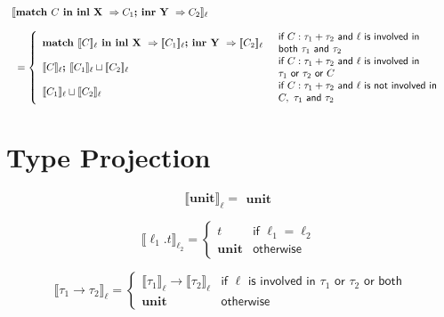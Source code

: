 \documentclass{article}
\begin{document}
$$\begin{array}{l}
 \llbracket  \textbf{match } C \textbf{ in inl X } \Rightarrow C_1 \textbf{; inr Y } \Rightarrow C_2 \rrbracket _\ell\\ \\ \;\;= \left\{
    \begin{array}{l l}
    \textbf{match }\llbracket C \rrbracket _\ell \textbf{ in inl X } \Rightarrow \llbracket C_1 \rrbracket _\ell \textbf{; inr Y } \Rightarrow \llbracket C_2 \rrbracket _\ell & 
    \begin{array}{l}
    \textsf{if } C : \tau_1 + \tau_2 \textsf{ and } \ell \textsf{ is involved in} \\ \textsf{both } \tau_1 \textsf{ and }\tau_2 
    \end{array}    \\
    \llbracket C \rrbracket _\ell \textbf{; } \llbracket C_1 \rrbracket _\ell \sqcup \llbracket C_2 \rrbracket _\ell & 
    \begin{array}{l}
    \textsf{if } C : \tau_1 + \tau_2 \textsf{ and } \ell \textsf{ is involved in } \\ \tau_1 \textsf{ or } \tau_2 \textsf{ or } C
    \end{array}    \\
    \llbracket C_1 \rrbracket _\ell \sqcup \llbracket C_2 \rrbracket _\ell & 
    \begin{array}{l}
    \textsf{if } C : \tau_1 + \tau_2 \textsf{ and } \ell \textsf{ is not involved in} \\ C, \ \tau_1 \textsf{ and } \tau_2 
    \end{array}
    \end{array}
\right.
\end{array}
$$

\section{Type Projection} 
$$
 \llbracket  \textbf{unit} \rrbracket _\ell =
    \begin{array}{ll}
    \textbf{unit}
    \end{array}
$$

$$
 \llbracket  \ell_1 . t \rrbracket _{\ell_2} = \left\{
    \begin{array}{ll}
    t & \textsf{if } \ell_1 = \ell_2 \\
    \textbf{unit} & \textsf{otherwise}
    \end{array}
\right.
$$

$$
 \llbracket  \tau_1 \to \tau_2 \rrbracket _\ell = \left\{
    \begin{array}{ll}
    \llbracket  \tau_1 \rrbracket _\ell \to \llbracket  \tau_2 \rrbracket _\ell & \textsf{if } \ell \textsf{ is involved in } \tau_1 \textsf{ or } \tau_2 \textsf{ or both}\\
    \textbf{unit} & \textsf{otherwise}
    \end{array}
\right.
$$
\end{document}
